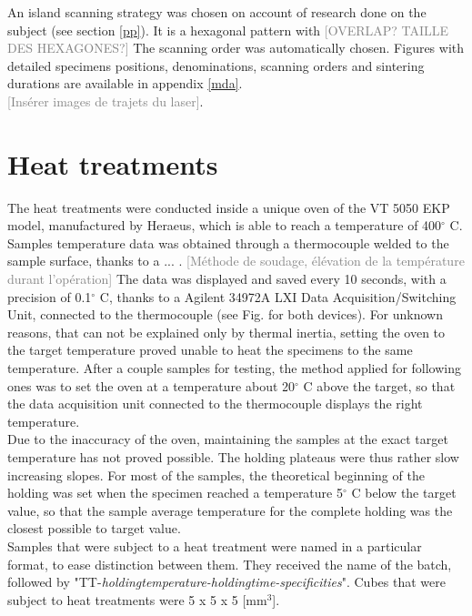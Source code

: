An island scanning strategy was chosen on account of research done on the subject (see section \ref{pp}). It is a hexagonal pattern with \textcolor{gray}{[OVERLAP? TAILLE DES HEXAGONES?]} The scanning order was automatically chosen. Figures with detailed specimens positions, denominations, scanning orders and sintering durations are available in appendix \ref{mda}.\\

\textcolor{gray}{[Insérer images de trajets du laser]}.\\



\section{Heat treatments}
\label{MMHT}
The heat treatments were conducted inside a unique oven of the VT 5050 EKP model, manufactured by Heraeus, which is able to reach a temperature of 400$^\circ$ C. Samples temperature data was obtained through a thermocouple welded to the sample surface, thanks to a ... . \textcolor{gray}{[Méthode de soudage, élévation de la température durant l'opération]} The data was displayed and saved every 10 seconds, with a precision of 0.1$^\circ$ C, thanks to a Agilent 34972A LXI Data Acquisition/Switching Unit, connected to the thermocouple (see Fig. for both devices). For unknown reasons, that can not be explained only by thermal inertia, setting the oven to the target temperature proved unable to heat the specimens to the same temperature. After a couple samples for testing, the method applied for following ones was to set the oven at a temperature about 20$^\circ$ C above the target, so that the data acquisition unit connected to the thermocouple displays the right temperature.\\

Due to the inaccuracy of the oven, maintaining the samples at the exact target temperature has not proved possible. The holding plateaus were thus rather slow increasing slopes. For most of the samples, the theoretical beginning of the holding was set when the specimen reached a temperature 5$^\circ$ C below the target value, so that the sample average temperature for the complete holding was the closest possible to target value.\\

Samples that were subject to a heat treatment were named in a particular format, to ease distinction between them. They received the name of the batch, followed by "TT-\textit{holdingtemperature-holdingtime-specificities}". Cubes that were subject to heat treatments were 5 x 5 x 5 [mm$^3$].\\

